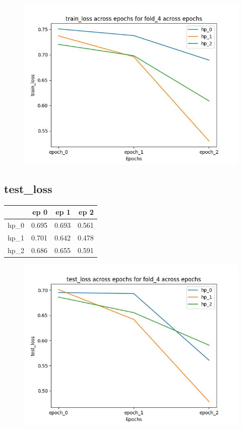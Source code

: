 \documentclass{article}
\begin{document}
\begin{figure}[H]
\includegraphics[scale = 0.75]{fold_4/train_loss}
\end{figure}
\subsection{test\_loss}
\begin{tabular}{lrrr}
\toprule
{} &   ep 0 &   ep 1 &   ep 2 \\
\midrule
hp\_0 &  0.695 &  0.693 &  0.561 \\
hp\_1 &  0.701 &  0.642 &  0.478 \\
hp\_2 &  0.686 &  0.655 &  0.591 \\
\bottomrule
\end{tabular}

\begin{figure}[H]
\includegraphics[scale = 0.75]{fold_4/test_loss}
\end{figure}
\end{document}
